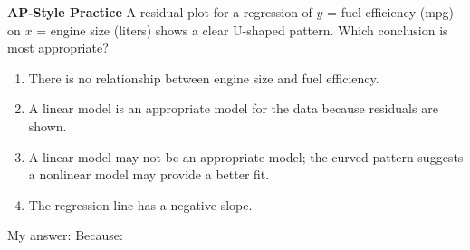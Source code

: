 \documentclass[10pt]{article}
\begin{document}
\begin{tcolorbox}[colback=redbg, colframe=redacc, boxrule=0.8pt, arc=2mm,
    left=4mm, right=4mm, top=2.5mm, bottom=2.5mm]
\small\textbf{AP-Style Practice}\enspace
A residual plot for a regression of $y$ = fuel efficiency (mpg) on $x$ = engine size (liters)
shows a clear U-shaped pattern. Which conclusion is most appropriate?

\vspace{7pt}
\begin{enumerate}[label=\textbf{(\Alph*)}, leftmargin=2em, itemsep=4pt]
  \item There is no relationship between engine size and fuel efficiency.
  \item A linear model is an appropriate model for the data because residuals are shown.
  \item A linear model may not be an appropriate model; the curved pattern suggests a
        nonlinear model may provide a better fit.
  \item The regression line has a negative slope.
\end{enumerate}
\end{tcolorbox}

\vspace{0.08in}
\noindent\textcolor{slate}{\small My answer: \blank{1cm} \quad Because: \blank{8.5cm}}
\end{document}
